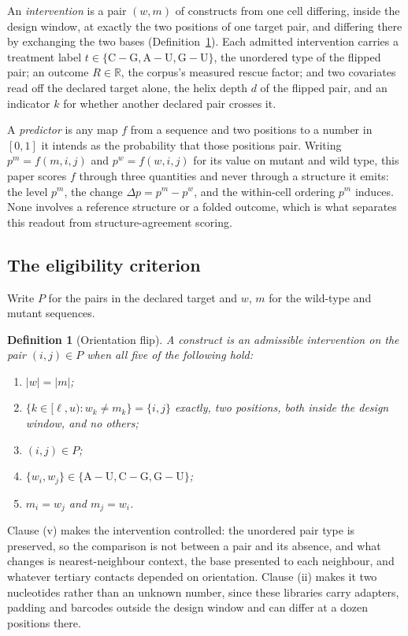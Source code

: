 \documentclass[11pt]{article}
\newtheorem{definition}{Definition}
\begin{document}
An \emph{intervention} is a pair $(w,m)$ of constructs from one cell differing, inside the design
window, at exactly the two positions of one target pair, and differing there by exchanging the two
bases (Definition~\ref{def:flip}). Each admitted intervention carries a treatment label
$t\in\{\mathrm{C\!-\!G},\mathrm{A\!-\!U},\mathrm{G\!-\!U}\}$, the unordered type of the flipped
pair; an outcome $R\in\mathbb{R}$, the corpus's measured rescue factor; and two covariates read off
the declared target alone, the helix depth $d$ of the flipped pair, and an indicator $k$ for
whether another declared pair crosses it.

A \emph{predictor} is any map $f$ from a sequence and two positions to a number in $[0,1]$ it
intends as the probability that those positions pair. Writing $p^{m}=f(m,i,j)$ and $p^{w}=f(w,i,j)$
for its value on mutant and wild type, this paper scores $f$ through three quantities and never
through a structure it emits: the level $p^{m}$, the change $\Delta p=p^{m}-p^{w}$, and the
within-cell ordering $p^{m}$ induces. None involves a reference structure or a folded outcome,
which is what separates this readout from structure-agreement scoring.


\subsection{The eligibility criterion}
\label{sec:mining}

Write $P$ for the pairs in the declared target and $w$, $m$ for the wild-type and mutant
sequences.

\begin{definition}[Orientation flip]
\label{def:flip}
A construct is an \emph{admissible intervention} on the pair $(i,j)\in P$ when all five of the
following hold:
\begin{enumerate}[leftmargin=2.4em,itemsep=1pt,label=(\roman*)]
\item $|w| = |m|$;
\item $\{k \in [\ell,u) : w_k \neq m_k\} = \{i,j\}$ exactly, two positions, both inside the
design window, and no others;
\item $(i,j) \in P$;
\item $\{w_i, w_j\} \in \{\mathrm{A\!-\!U}, \mathrm{C\!-\!G}, \mathrm{G\!-\!U}\}$;
\item $m_i = w_j$ and $m_j = w_i$.
\end{enumerate}
\end{definition}

Clause (v) makes the intervention controlled: the unordered pair type is preserved, so the
comparison is not between a pair and its absence, and what changes is nearest-neighbour context,
the base presented to each neighbour, and whatever tertiary contacts depended on orientation.
Clause (ii) makes it two nucleotides rather than an unknown number, since these libraries carry
adapters, padding and barcodes outside the design window and can differ at a dozen positions
there.
\end{document}

